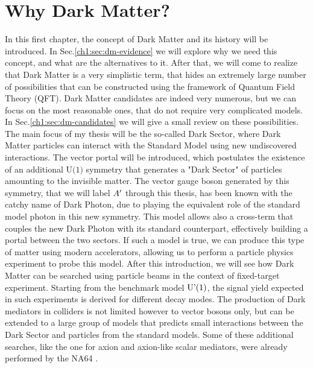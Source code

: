 
\newcommand{\pdirone}{chapters/plots/chapter1}


\chapter{Why Dark Matter?} %

\label{chapter1}

In this first chapter, the concept of Dark Matter and its history will be introduced. In Sec.\ref{ch1:sec:dm-evidence} we will explore why we need this concept, and what are the alternatives to it. After that, we will come to realize that Dark Matter is a very simplistic term, that hides an extremely large number of possibilities that can be constructed using the framework of Quantum Field Theory (QFT). Dark Matter candidates are indeed very numerous, but we can focus on the most reasonable ones, that do not require very complicated models. In Sec.\ref{ch1:sec:dm-candidates} we will give a small review on these possibilities. The main focus of my thesis will be the so-called Dark Sector, where Dark Matter particles can interact with the Standard Model using new undiscovered interactions. The vector portal will be introduced, which postulates the existence of an additional $\textrm{U(1)}$ symmetry that generates a "Dark Sector" of particles amounting to the invisible matter. The vector gauge boson generated by this symmetry, that we will label $A'$ through this thesis, has been known with the catchy name of Dark Photon, due to playing the equivalent role of the standard model photon in this new symmetry. This model allows also a cross-term that couples the new Dark Photon with its standard counterpart, effectively building a portal between the two sectors. If such a model is true, we can produce this type of matter using modern accelerators, allowing us to perform a particle physics experiment to probe this model. After this introduction, we will see how Dark Matter can be searched using particle beams in the context of fixed-target experiment. Starting from the benchmark model $\textrm{U'(1)}$, the signal yield expected in such experiments is derived for different decay modes. The production of Dark mediators in colliders is not limited however to vector bosons only, but can be extended to a large group of models that predicts small interactions between the Dark Sector and particles from the standard models. Some of these additional searches, like the one for axion and axion-like scalar mediators, were already performed by the NA64 .
